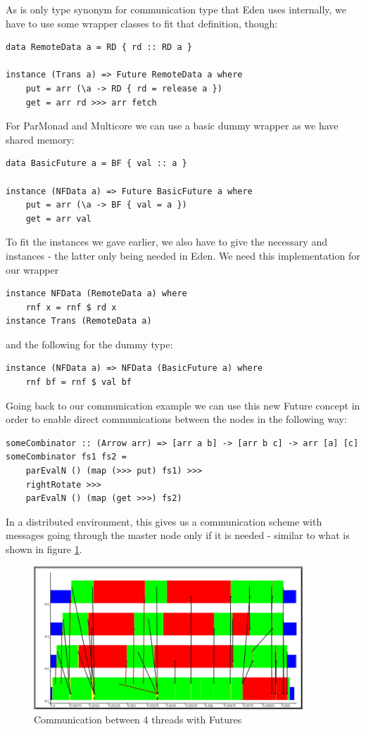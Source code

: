As  is only type synonym for communication type that Eden uses internally, we have to use some wrapper classes to fit that definition, though:
\begin{lstlisting}[frame=htrbl]
data RemoteData a = RD { rd :: RD a }

instance (Trans a) => Future RemoteData a where
    put = arr (\a -> RD { rd = release a })
    get = arr rd >>> arr fetch
\end{lstlisting}
For ParMonad and Multicore we can use a basic dummy wrapper as we have shared memory:
\begin{lstlisting}[frame=htrbl]
data BasicFuture a = BF { val :: a }

instance (NFData a) => Future BasicFuture a where
    put = arr (\a -> BF { val = a })
    get = arr val
\end{lstlisting}
To fit the  instances we gave earlier, we also have to give the necessary  and  instances - the latter only being needed in Eden.
We need this implementation for our  wrapper
\begin{lstlisting}[frame=htrbl]
instance NFData (RemoteData a) where
    rnf x = rnf $ rd x
instance Trans (RemoteData a)
\end{lstlisting}
and the following for the  dummy type:
\begin{lstlisting}[frame=htrbl]
instance (NFData a) => NFData (BasicFuture a) where
    rnf bf = rnf $ val bf
\end{lstlisting}
Going back to our communication example we can use this new Future concept in order to enable direct communications between the nodes in the following way:
\begin{lstlisting}[frame=htrbl]
someCombinator :: (Arrow arr) => [arr a b] -> [arr b c] -> arr [a] [c]
someCombinator fs1 fs2 =
	parEvalN () (map (>>> put) fs1) >>>
	rightRotate >>>
	parEvalN () (map (get >>>) fs2)
\end{lstlisting}
In a distributed environment, this gives us a communication scheme with messages going through the master node only if it is needed - similar to what is shown in figure \ref{fig:withFutures}.
\begin{figure}[ht]
	\centering
	\includegraphics[width=0.9\textwidth]{images/withFutures}
	\caption[with Futures]{Communication between 4 threads with Futures}
	\label{fig:withFutures}
\end{figure}